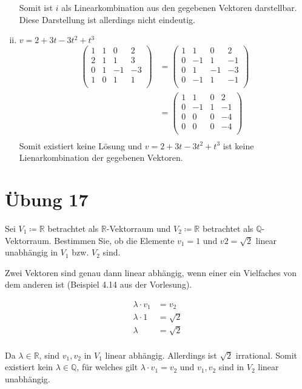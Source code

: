 \documentclass{article}
\begin{document}
\begin{enumerate}[(i)]
  Somit ist $i$ als Linearkombination aus den gegebenen Vektoren darstellbar. Diese Darstellung ist allerdings nicht eindeutig.
       
\item $v = 2 + 3t - 3t^2 + t^3$
  \begin{align*}
    \left(
    \begin{array}{ccc|c}
      1 & 1 & 0  & 2  \\
      2 & 1 & 1  & 3  \\
      0 & 1 & -1 & -3 \\
      1 & 0 & 1  & 1  \\
    \end{array}
    \right)
    &=
    \left(
    \begin{array}{ccc|c}
      1 & 1  & 0  & 2  \\
      0 & -1 & 1  & -1  \\
      0 & 1  & -1 & -3 \\
      0 & -1 & 1  & -1  \\
    \end{array}
    \right) \\
    &=
    \left(
    \begin{array}{ccc|c}
      1 & 1  & 0 & 2  \\
      0 & -1 & 1 & -1 \\
      0 & 0  & 0 & -4 \\
      0 & 0  & 0 & -4 \\
    \end{array}
    \right) \\
  \end{align*}
  Somit existiert keine Lösung und  $v = 2 + 3t - 3t^2 + t^3$ ist keine Lienarkombination der gegebenen Vektoren.
\end{enumerate}

\section*{Übung 17}

Sei $V_1 \coloneqq \mathbb{R}$ betrachtet als $\mathbb{R}$-Vektorraum und 
$V_2 \coloneqq \mathbb{R}$ betrachtet als $\mathbb{Q}$-Vektorraum.
Bestimmen Sie, ob die Elemente $v_1 = 1$ und $v2 = \sqrt{2}$ linear unabhängig in
$V_1$ bzw. $V_2$ sind.


Zwei Vektoren sind genau dann linear abhängig, wenn einer ein Vielfaches von dem anderen ist (Beispiel 4.14 aus der Vorlesung).

\begin{align*}
  \lambda \cdot v_1 &= v_2 \\
  \lambda \cdot 1 &= \sqrt{2} \\
  \lambda &= \sqrt{2} \\
\end{align*}

Da $\lambda \in \mathbb{R}$, sind $v_1, v_2$ in $V_1$ linear abhängig. Allerdings ist $\sqrt{2}$ irrational. Somit existiert
kein $\lambda \in \mathbb{Q}$, für welches gilt $\lambda \cdot v_1 = v_2$ und $v_1, v_2$ sind in $V_2$ linear unabhängig.
\end{document}
